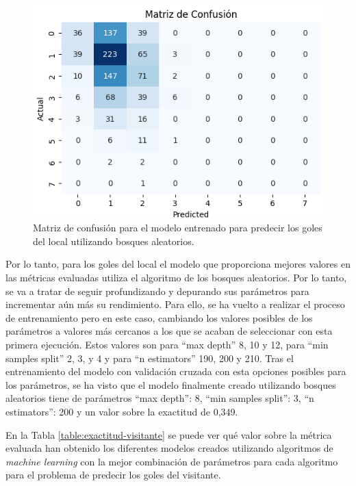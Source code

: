 \begin{figure}[H]
    \centering
    \includegraphics[scale=0.60]{svg/matriz-bosque-local.png}
    \caption{Matriz de confusión para el modelo entrenado para predecir los goles del local utilizando bosques aleatorios. }
    \label{fig:matriz-bosque-local}
\end{figure}


Por lo tanto, para los goles del local el modelo que proporciona mejores valores en las métricas evaluadas utiliza el algoritmo de los bosques aleatorios. Por lo tanto, se va a tratar de seguir profundizando y depurando sus parámetros para incrementar aún más su rendimiento. Para ello, se ha vuelto a realizar el proceso de entrenamiento pero en este caso, cambiando los valores posibles de los parámetros a valores más cercanos a los que se acaban de seleccionar con esta primera ejecución. Estos valores son para ``max depth'' 8, 10 y 12, para ``min samples split'' 2, 3, y 4 y para ``n estimators'' 190, 200 y 210. Tras el entrenamiento del modelo con validación cruzada con esta opciones posibles para los parámetros, se ha visto que el modelo finalmente creado utilizando bosques aleatorios tiene de parámetros ``max depth'': 8, ``min samples split'': 3, ``n estimators'': 200 y un valor sobre la exactitud de 0,349.













En la Tabla \ref{table:exactitud-visitante} se puede ver qué valor sobre la métrica evaluada han obtenido los diferentes modelos creados utilizando algoritmos de \textit{machine learning} con la mejor combinación de parámetros para cada algoritmo para el problema de predecir los goles del visitante.

